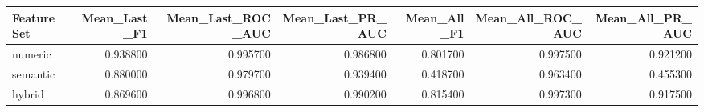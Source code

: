 \begin{tabular}{lrrrrrr}
\toprule
Feature Set & Mean\_Last\_F1 & Mean\_Last\_ROC\_AUC & Mean\_Last\_PR\_AUC & Mean\_All\_F1 & Mean\_All\_ROC\_AUC & Mean\_All\_PR\_AUC \\
\midrule
numeric & 0.938800 & 0.995700 & 0.986800 & 0.801700 & 0.997500 & 0.921200 \\
semantic & 0.880000 & 0.979700 & 0.939400 & 0.418700 & 0.963400 & 0.455300 \\
hybrid & 0.869600 & 0.996800 & 0.990200 & 0.815400 & 0.997300 & 0.917500 \\
\bottomrule
\end{tabular}
